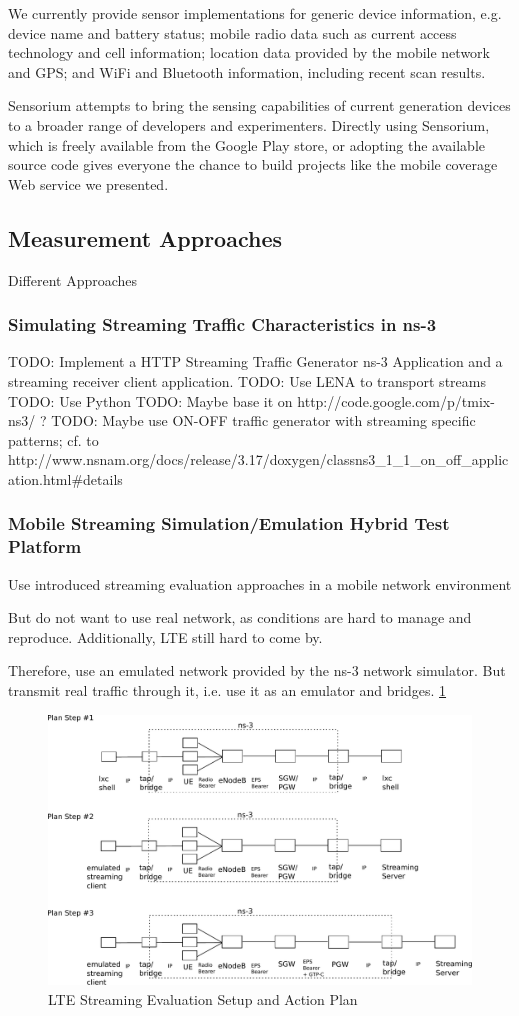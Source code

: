 We currently provide sensor implementations for generic device information, e.g. device name and battery status; mobile radio data such as current access technology and cell information; location data provided by the mobile network and GPS; and  WiFi and Bluetooth information, including recent scan results.

Sensorium attempts to bring the sensing capabilities of current generation devices to a broader range of developers and experimenters. Directly using Sensorium, which is freely available from the Google Play store, or adopting the available source code gives everyone the chance to build projects like the mobile coverage Web service we presented.


\subsection{Measurement Approaches}

Different Approaches

\subsubsection{Simulating Streaming Traffic Characteristics in ns-3}

TODO: Implement a HTTP Streaming Traffic Generator ns-3 Application and a streaming receiver client application.
TODO: Use LENA to transport streams
TODO: Use Python
TODO: Maybe base it on http://code.google.com/p/tmix-ns3/ ?
TODO: Maybe use ON-OFF traffic generator with streaming specific patterns; cf. to http://www.nsnam.org/docs/release/3.17/doxygen/classns3\_1\_1\_on\_off\_application.html\#details


\subsubsection{Mobile Streaming Simulation/Emulation Hybrid Test Platform}

Use introduced streaming evaluation approaches in a mobile network environment

But do not want to use real network, as conditions are hard to manage and reproduce. Additionally, LTE still hard to come by.

Therefore, use an emulated network provided by the ns-3 network simulator. But transmit real traffic through it, i.e. use it as an emulator and bridges. \ref{fig:lte-testbed}

\begin{figure}
\centering
\includegraphics[width=\textwidth]{images/lte-testbed.pdf}
\caption{LTE Streaming Evaluation Setup and Action Plan}
\label{fig:lte-testbed}
\end{figure}